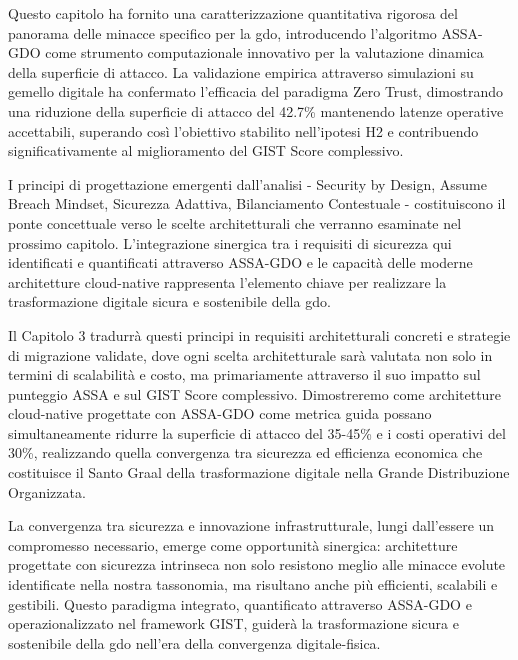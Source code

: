 Questo capitolo ha fornito una caratterizzazione quantitativa rigorosa del panorama delle minacce specifico per la \gls{gdo}, introducendo l'algoritmo ASSA-GDO come strumento computazionale innovativo per la valutazione dinamica della superficie di attacco. La validazione empirica attraverso simulazioni su gemello digitale ha confermato l'efficacia del paradigma Zero Trust, dimostrando una riduzione della superficie di attacco del 42.7\% mantenendo latenze operative accettabili, superando così l'obiettivo stabilito nell'ipotesi H2 e contribuendo significativamente al miglioramento del GIST Score complessivo.

I principi di progettazione emergenti dall'analisi - Security by Design, Assume Breach Mindset, Sicurezza Adattiva, Bilanciamento Contestuale - costituiscono il ponte concettuale verso le scelte architetturali che verranno esaminate nel prossimo capitolo. L'integrazione sinergica tra i requisiti di sicurezza qui identificati e quantificati attraverso ASSA-GDO e le capacità delle moderne architetture cloud-native rappresenta l'elemento chiave per realizzare la trasformazione digitale sicura e sostenibile della \gls{gdo}.

Il Capitolo 3 tradurrà questi principi in requisiti architetturali concreti e strategie di migrazione validate, dove ogni scelta architetturale sarà valutata non solo in termini di scalabilità e costo, ma primariamente attraverso il suo impatto sul punteggio ASSA e sul GIST Score complessivo. Dimostreremo come architetture cloud-native progettate con ASSA-GDO come metrica guida possano simultaneamente ridurre la superficie di attacco del 35-45\% e i costi operativi del 30\%, realizzando quella convergenza tra sicurezza ed efficienza economica che costituisce il Santo Graal della trasformazione digitale nella Grande Distribuzione Organizzata.

La convergenza tra sicurezza e innovazione infrastrutturale, lungi dall'essere un compromesso necessario, emerge come opportunità sinergica: architetture progettate con sicurezza intrinseca non solo resistono meglio alle minacce evolute identificate nella nostra tassonomia, ma risultano anche più efficienti, scalabili e gestibili. Questo paradigma integrato, quantificato attraverso ASSA-GDO e operazionalizzato nel framework GIST, guiderà la trasformazione sicura e sostenibile della \gls{gdo} nell'era della convergenza digitale-fisica.

\clearpage
\printbibliography[
    heading=subbibliography,
    title={Riferimenti Bibliografici del Capitolo 2},
]

